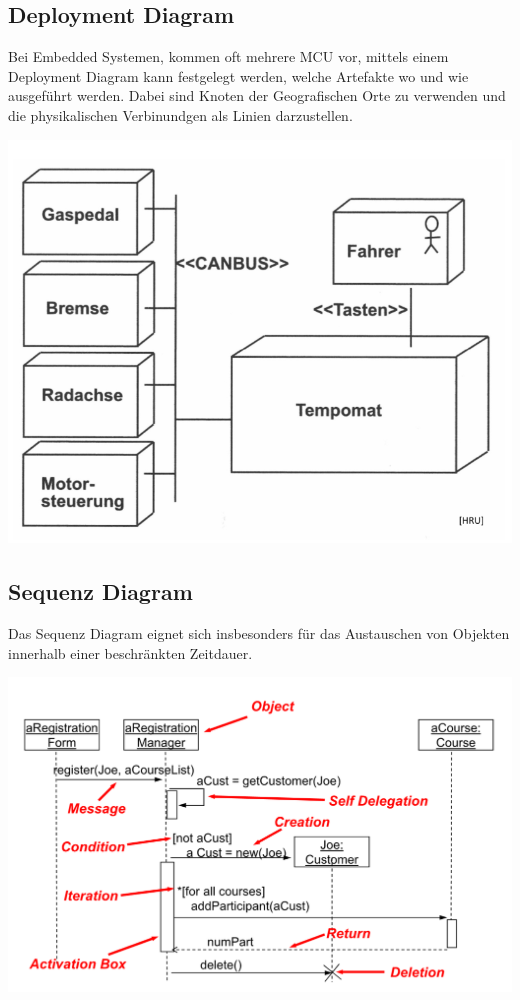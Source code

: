 \subsection{Deployment Diagram}
Bei Embedded Systemen, kommen oft mehrere MCU vor, mittels einem Deployment Diagram kann festgelegt werden, welche Artefakte wo und wie ausgeführt werden. Dabei sind Knoten der Geografischen Orte zu verwenden und die physikalischen Verbinundgen als Linien darzustellen.
\begin{center}
	\includegraphics[width=\columnwidth]{Images/deployment-diagram}
\end{center}

\subsection{Sequenz Diagram}
Das Sequenz Diagram eignet sich insbesonders für das Austauschen von Objekten innerhalb einer beschränkten Zeitdauer. 
\begin{center}
	\includegraphics[width=\columnwidth]{Images/seq-diagram}
\end{center}

